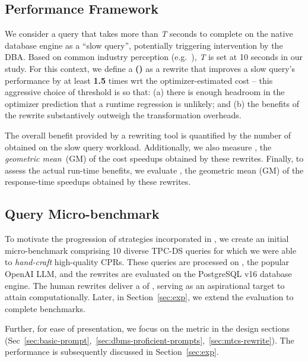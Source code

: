 \subsection{Performance Framework}

We consider a query that takes more than \emph{T} seconds to complete on the native database engine as a ``slow query'', potentially triggering intervention by the DBA. Based on common industry perception (e.g.~\cite{mysql}), \emph{T} is set at 10 seconds in our study. For this context, we define a \textbf{\CPR (\cpr)} as a rewrite that improves a slow query's performance by at least \textbf{1.5} times wrt the optimizer-estimated cost -- this aggressive choice of threshold is so that: 
%
(a) there is enough headroom in the optimizer prediction that a runtime regression is unlikely; and (b) the benefits of the rewrite substantively outweigh the transformation overheads.
%

The overall benefit provided by a rewriting tool is quantified by the number of \cpr obtained on the slow query workload. Additionally, we also measure \textbf{\csgm}, the \textit{geometric mean}~(GM) of the cost speedups obtained by these rewrites. Finally, to assess the actual run-time benefits, we evaluate \textbf{\tsgm}, the geometric mean (GM) of the response-time speedups obtained by these rewrites.

\subsection{Query Micro-benchmark}
To motivate the progression of strategies incorporated in \lithe, we create an initial micro-benchmark comprising 10 diverse TPC-DS queries for which we were able to \emph{hand-craft} high-quality CPRs. These queries are processed on \gpt, the popular OpenAI LLM, and the rewrites are evaluated on the PostgreSQL v16 database engine. The human rewrites deliver a \csgm of \textbf{\gmGodMicroDS}, serving as an aspirational target to attain computationally.
Later, in Section~\ref{sec:exp}, we extend the evaluation to 
complete benchmarks. 

Further, for ease of presentation, we focus on the \csgm metric in the \lithe design sections (Sec~\ref{sec:basic-prompt},~\ref{sec:dbms-proficient-prompts},~\ref{sec:mtcs-rewrite}). The \tsgm performance is subsequently discussed in Section~\ref{sec:exp}. 





